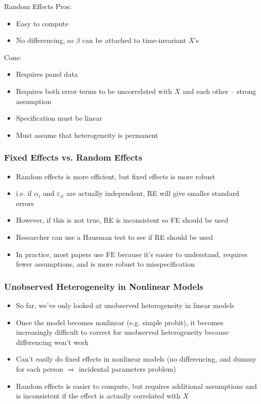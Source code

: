 \documentclass[english,xcolor=dvipsnames]{beamer}
\newcommand{\bi}{\begin{itemize}}
\newcommand{\ei}{\end{itemize}}
\begin{document}
\begin{frame}{Random Effects}
Pros:
      \bi 
      \item Easy to compute
      \item No differencing, so $\beta$ can be attached to time-invariant $X$'s
      \ei
Cons:
      \bi 
      \item Requires panel data
      \item Requires both error terms to be uncorrelated with $X$ and each other -- strong assumption
      \item Specification must be linear
      \item Must assume that heterogeneity is permanent
      \ei
\end{frame}

\begin{frame}
\frametitle{Fixed Effects vs. Random Effects}
   \bi 
   \item Random effects is more efficient, but fixed effects is more robust
   \item i.e. if $\alpha_{i}$ and $\varepsilon_{it}$ are actually independent, RE will give smaller standard errors
   \item However, if this is not true, RE is inconsistent so FE should be used
   \item Researcher can use a Hausman test to see if RE should be used
   \item In practice, most papers use FE because it's easier to understand, requires fewer assumptions, and is more robust to misspecification
   \ei
\end{frame}

\begin{frame}
\frametitle{Unobserved Heterogeneity in Nonlinear Models}
   \bi 
   \item So far, we've only looked at unobserved heterogeneity in linear models
   \item Once the model becomes nonlinear (e.g. simple probit), it becomes increasingly difficult to correct for unobserved heterogeneity because differencing won't work
   \item Can't easily do fixed effects in nonlinear models (no differencing, and dummy for each person $\Rightarrow$ incidental parameters problem)
   \item Random effects is easier to compute, but requires additional assumptions and is inconsistent if the effect is actually correlated with $X$
   \ei
\end{frame}
\end{document}
